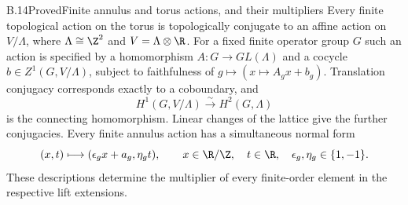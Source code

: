 \begin{claim}{B.14}{Proved}{Finite annulus and torus actions, and their multipliers}
Every finite topological action on the torus is topologically conjugate to an
affine action on $V/\Lambda$, where $\Lambda\cong\Z^2$ and
$V=\Lambda\otimes\R$. For a fixed finite operator group $G$ such an action is
specified by a homomorphism $A:G\to GL(\Lambda)$ and a cocycle
$b\in Z^1(G,V/\Lambda)$, subject to faithfulness of
$g\mapsto(x\mapsto A_gx+b_g)$. Translation conjugacy corresponds exactly to a
coboundary, and
\[
 H^1(G,V/\Lambda)\xrightarrow{\sim}H^2(G,\Lambda)
\]
is the connecting homomorphism. Linear changes of the lattice give the further
conjugacies. Every finite annulus action has a simultaneous normal form
\[
 (x,t)\longmapsto(\epsilon_g x+a_g,\eta_g t),
 \qquad x\in\R/\Z,\quad t\in\R,\quad
 \epsilon_g,\eta_g\in\{1,-1\}.
\]
These descriptions determine the multiplier of every finite-order element in
the respective lift extensions.
\end{claim}
